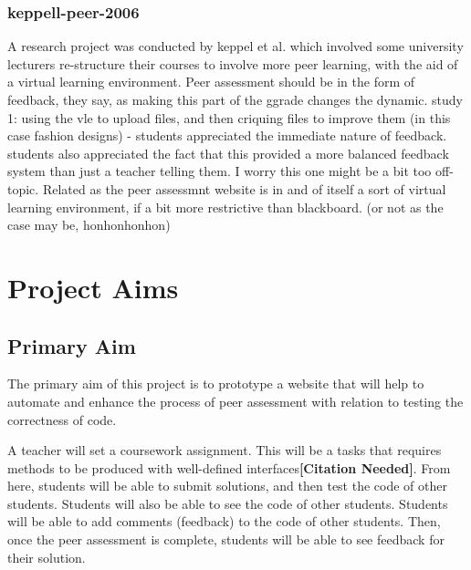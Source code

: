\documentclass[a4paper,11pt]{report}
\newcommand{\cn}{\textbf{[Citation Needed]}}
\begin{document}
\subsection{keppell-peer-2006}
A research project was conducted by keppel et al.\cite{keppell_peer_2006} which involved some university lecturers re-structure their courses to involve more peer learning, with the aid of a virtual learning environment. 
Peer assessment should be in the form of feedback, they say, as making this part of the ggrade changes the dynamic.
study 1: using the vle to upload files, and then criquing files to improve them (in this case fashion designs) - students appreciated the immediate nature of feedback. students also appreciated the fact that this provided a more balanced feedback system than just a teacher telling them. 
I worry this one might be a bit too off-topic.
Related as the peer assessmnt website is in and of itself a sort of virtual learning environment, if a bit more restrictive than blackboard. (or not as the case may be, honhonhonhon)


\chapter{Project Aims}
\section{Primary Aim}
The primary aim of this project is to prototype a website that will help to automate and enhance the process of peer assessment with relation to testing the correctness of code.\par
A teacher will set a coursework assignment. This will be a tasks that requires methods to be produced with well-defined interfaces\cn. From here, students will be able to submit solutions, and then test the code of other students. Students will also be able to see the code of other students. Students will be able to add comments (feedback) to the code of other students. Then, once the peer assessment is complete, students will be able to see feedback for their solution.
\end{document}
